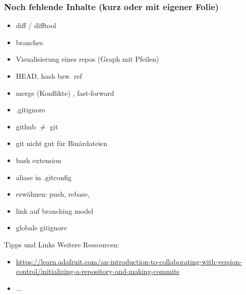 \documentclass{beamer}
\begin{document}
%
%
%
%
%
%
%
%
%


\begin{frame}[label=gitintro50]
\frametitle{Noch fehlende Inhalte (kurz oder mit eigener Folie)}
\begin{itemize}
\item diff \checkmark / difftool
\item branches \checkmark
\item Visualisierung eines repos (Graph mit Pfeilen) \checkmark
\item HEAD\checkmark , hash bzw. ref
\item merge (Konflikte) \checkmark, fast-forward \checkmark
\item .gitignore
\item github $\neq$ git
\item git nicht gut für Binärdateien
\item bash extension
\item aliase in .gitconfig
\item erwähnen: push,  rebase,
\item link auf branching model
\item globale gitignore

\end{itemize}
\end{frame}


\begin{frame}[label=link10]{Tipps und Links}
Weitere Ressourcen:
\tiny
\begin{itemize}
 \item
\url{https://learn.adafruit.com/an-introduction-to-collaborating-with-version-control/initializing-a-repository-and-making-commits}
\item ...
\end{itemize}


\end{frame}
\end{document}
